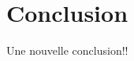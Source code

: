 \documentclass[a4paper,11pt]{article}
\begin{document}




\section*{Conclusion}
 Une nouvelle conclusion!! 
 


\nocite*{}

  
\end{document}
